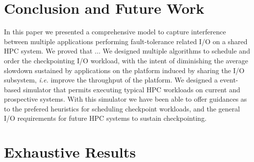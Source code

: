 \documentclass[conference]{IEEEtran}
\newcommand{\ie}[0]{\emph{i.e.}\xspace}
\begin{document}
\section{Conclusion and Future Work}
\label{sec:conclusion}

In this paper we presented a comprehensive model to capture interference
between multiple applications performing fault-tolerance related I/O
on a shared HPC system. We proved that ... We designed multiple algorithms
to schedule and order the checkpointing I/O workload, with the intent of
diminishing the average slowdown sustained by applications on the
platform induced by sharing the I/O subsystem, \ie improve the throughput
of the platform. We designed a event-based simulator that permits
executing typical HPC workloads on current and prospective systems.
With this simulator we have been able to offer guidances as to the
prefered heuristics for scheduling checkpoint workloads, and the
general I/O requirements for future HPC systems to sustain checkpointing.







\newpage
\appendix

\section{Exhaustive Results}
\end{document}
